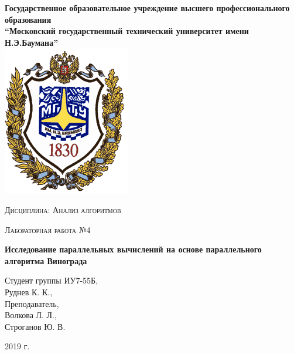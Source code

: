 \documentclass[a4paper,12pt]{report}
\begin{document}
    \begin{titlepage}

        \begin{center}
            \large
            \textbf{Государственное образовательное учреждение высшего профессионального образования\\
            “Московский государственный технический университет имени Н.Э.Баумана”\\}
            \includegraphics{bmstu-logo.png}
			\vspace{1cm}
            
            \textsc{Дисциплина: Анализ алгоритмов}
            \vspace{0.5cm}
                
            \textsc{Лабораторная работа №4}
            \vspace{1cm}
            
            {\LARGE \textbf{Исследование параллельных вычислений на основе параллельного алгоритма Винограда}}
            \vspace{3cm}
                    
            \begin{flushright}
            	Студент группы ИУ7-55Б,\\   
            	Руднев К. К.,\\
            	\vspace{0.5cm}
            	Преподаватель,\\
            	Волкова Л. Л.,\\
            	Строганов Ю. В.
            	
            \end{flushright}
            \vfill
            
            2019 г.
            
            \end{center}

    \end{titlepage}
\end{document}
